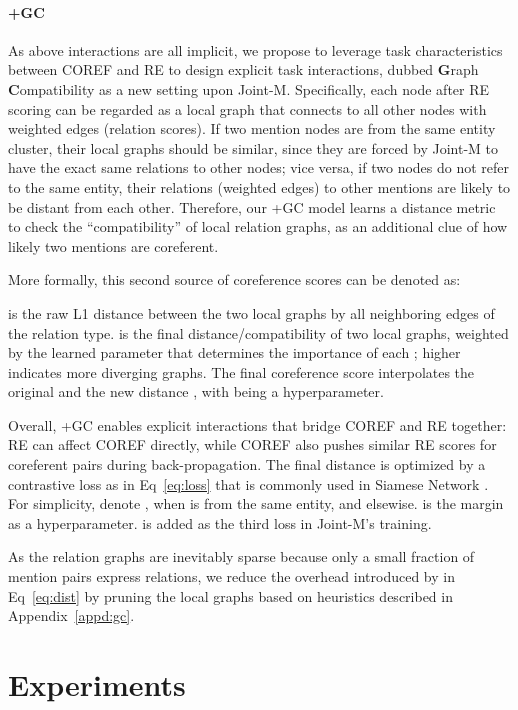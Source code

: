 \documentclass[11pt]{article}
\begin{document}
\paragraph{+GC}
As above interactions are all implicit, we propose to leverage task characteristics between COREF and RE to design explicit task interactions, dubbed \textbf{G}raph \textbf{C}ompatibility as a new setting upon Joint-M. Specifically, each node after RE scoring can be regarded as a local graph that connects to all other nodes with weighted edges (relation scores). If two mention nodes are from the same entity cluster, their local graphs should be similar, since they are forced by Joint-M to have the exact same relations to other nodes; vice versa, if two nodes do not refer to the same entity, their relations (weighted edges) to other mentions are likely to be distant from each other. Therefore, our +GC model learns a distance metric to check the ``compatibility'' of local relation graphs, as an additional clue of how likely two mentions are coreferent.

More formally, this second source of coreference scores  can be denoted as:

 is the raw L1 distance between the two local graphs by all neighboring edges of the  relation type.
 is the final distance/compatibility of two local graphs, weighted by the learned parameter  that determines the importance of each ; higher  indicates more diverging graphs.
The final coreference score  interpolates the original  and the new distance , with  being a hyperparameter.

Overall, +GC enables explicit interactions that bridge COREF and RE together: RE can affect COREF directly, while COREF also pushes similar RE scores for coreferent pairs during back-propagation. The final distance  is optimized by a contrastive loss as in Eq~\eqref{eq:loss} that is commonly used in Siamese Network \citep{siamese}. For simplicity, denote ,  when  is from the same entity, and  elsewise.  is the margin as a hyperparameter.  is added as the third loss in Joint-M's training.

As the relation graphs are inevitably sparse because only a small fraction of mention pairs express relations, we reduce the overhead introduced by  in Eq~\eqref{eq:dist} by pruning the local graphs based on heuristics described in Appendix~\ref{appd:gc}.


 \section{Experiments}
\label{sec:experiments}
\end{document}

